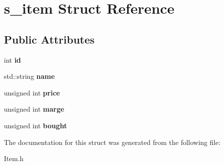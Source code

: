 \hypertarget{structs__item}{}\section{s\+\_\+item Struct Reference}
\label{structs__item}
\subsection*{Public Attributes}
\begin{DoxyCompactItemize}
\item 
int {\bfseries id}\hypertarget{structs__item_a01a252a1625deed43782cb25ae3320ec}{}\label{structs__item_a01a252a1625deed43782cb25ae3320ec}

\item 
std\+::string {\bfseries name}\hypertarget{structs__item_ac0f38c44e968b7e05461b88d914294ce}{}\label{structs__item_ac0f38c44e968b7e05461b88d914294ce}

\item 
unsigned int {\bfseries price}\hypertarget{structs__item_a27f14e8e7f3245416cfdcc7efad18716}{}\label{structs__item_a27f14e8e7f3245416cfdcc7efad18716}

\item 
unsigned int {\bfseries marge}\hypertarget{structs__item_a68751d16f349cdc743522407b8b5fc4b}{}\label{structs__item_a68751d16f349cdc743522407b8b5fc4b}

\item 
unsigned int {\bfseries bought}\hypertarget{structs__item_aab836ed002b9734c330911715afcbb93}{}\label{structs__item_aab836ed002b9734c330911715afcbb93}

\end{DoxyCompactItemize}


The documentation for this struct was generated from the following file\+:\begin{DoxyCompactItemize}
\item 
Item.\+h\end{DoxyCompactItemize}
